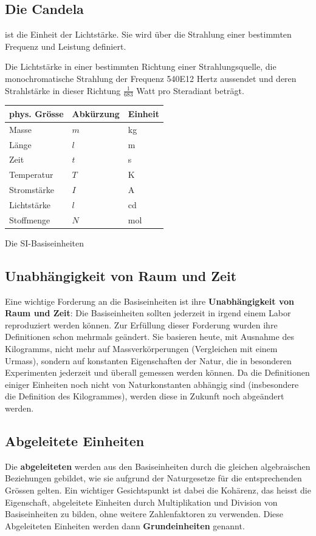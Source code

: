 \subsection{Die Candela} ist die Einheit der Lichtstärke. Sie wird über die Strahlung einer bestimmten Frequenz und Leistung definiert.
\begin{definition}
Die Lichtstärke in einer bestimmten Richtung einer Strahlungsquelle, die monochromatische Strahlung der Frequenz \SI{540E12}{} Hertz aussendet und deren Strahlstärke in dieser Richtung $\frac{1}{683}$ Watt pro Steradiant beträgt.
\end{definition}

\begin{margintable}
\begin{tabular}{l l l}
	\toprule
	phys. Grösse  & Abkürzung  & Einheit \\
	\midrule
	Masse	& $m$	     & \si{\kilogram} \\
	Länge 	& $l$	     & \si{\metre} \\
	Zeit	& $t$  	     & \si{\second} \\
	Temperatur & $T$     & \si{\kelvin} \\
	Stromstärke & $I$    & \si{\ampere} \\
	Lichtstärke & $l$    & \si{\candela} \\
	Stoffmenge & $N$     & \si{mol} \\
	\bottomrule
\end{tabular}
\caption{Die SI-Basiseinheiten}
\end{margintable}

\subsection{Unabhängigkeit von Raum und Zeit}
Eine wichtige Forderung an die Basiseinheiten ist ihre \textbf{Unabhängigkeit von Raum und Zeit}: Die Basiseinheiten sollten 
jederzeit in irgend einem Labor reproduziert werden können. 
Zur Erfüllung dieser Forderung wurden ihre Definitionen schon 
mehrmals geändert. Sie basieren heute, mit Ausnahme des 
Kilogramms, nicht mehr auf Massverkörperungen (Vergleichen mit einem Urmass), sondern auf 
konstanten Eigenschaften der Natur, die in besonderen Experimenten jederzeit und überall gemessen werden können. Da die Definitionen einiger Einheiten noch nicht von Naturkonstanten abhängig sind (insbesondere die Definition des Kilogrammes), werden diese in Zukunft noch abgeändert werden.
\subsection{Abgeleitete Einheiten}
Die \textbf{abgeleiteten} werden aus den Basiseinheiten durch die gleichen algebraischen Beziehungen gebildet, wie sie aufgrund der Naturgesetze für die entsprechenden Grössen gelten. 
Ein wichtiger Gesichtspunkt ist dabei die Kohärenz, das heisst 
die Eigenschaft, abgeleitete Einheiten durch Multiplikation und 
Division von Basiseinheiten zu bilden, ohne weitere Zahlenfaktoren zu verwenden. Diese Abgeleiteten Einheiten werden dann \textbf{Grundeinheiten} genannt.

